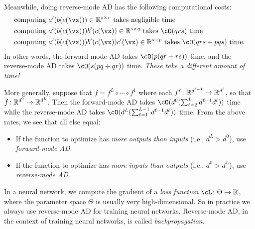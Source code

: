 \documentclass[../../book-main.tex]{subfiles}
\begin{document}
Meanwhile, doing reverse-mode AD has the following computational costs:
\begin{align}
    &\text{computing}\ a^{\prime}(b(c(\vx))) \in \R^{s \times r}\ \text{takes negligible time} \\
    &\text{computing}\ a^{\prime}(b(c(\vx)))b^{\prime}(c(\vx)) \in \R^{s \times q}\ \text{takes \(\cO(qrs)\) time} \\
    &\text{computing}\ a^{\prime}(b(c(\vx)))b^{\prime}(c(\vx))c^{\prime}(\vx) \in \R^{s \times p}\ \text{takes \(\cO(qrs + pqs)\) time.}
\end{align}
In other words, the forward-mode AD takes \(\cO(p(qr + rs))\) time, and the reverse-mode AD takes \(\cO(s(pq + qr))\) time. \textit{These take a different amount of time!} 

More generally, suppose that \(f = f^{L} \circ \cdots \circ f^{1}\) where each \(f^{\ell} \colon \mathbb{R}^{d^{\ell - 1}} \to \mathbb{R}^{d^{\ell}}\), so that \(f \colon \mathbb{R}^{d^{0}} \to \mathbb{R}^{d^{L}}\). Then the forward-mode AD takes \(\cO(d^{0}(\sum_{\ell = 2}^{L}d^{\ell - 1}d^{\ell}))\) time while the reverse-mode AD takes \(\cO(d^{L}(\sum_{\ell = 1}^{L - 1}d^{\ell - 1}d^{\ell}))\) time. From the above rates, we see that all else equal:
\begin{itemize}
    \item If the function to optimize has \textit{more outputs than inputs} (i.e., \(d^{L} > d^{0}\)), use \textit{forward-mode AD}.
    \item If the function to optimize has \textit{more inputs than outputs} (i.e., \(d^{0} > d^{L}\)), use \textit{reverse-mode AD}.
\end{itemize}
In a neural network, we compute the gradient of a \textit{loss function} \(\cL \colon \Theta \to \R\), where the parameter space \(\Theta\) is usually very high-dimensional. So in practice we always use reverse-mode AD for training neural networks. Reverse-mode AD, in the context of training neural networks, is called \textit{backpropagation}.
\end{document}
